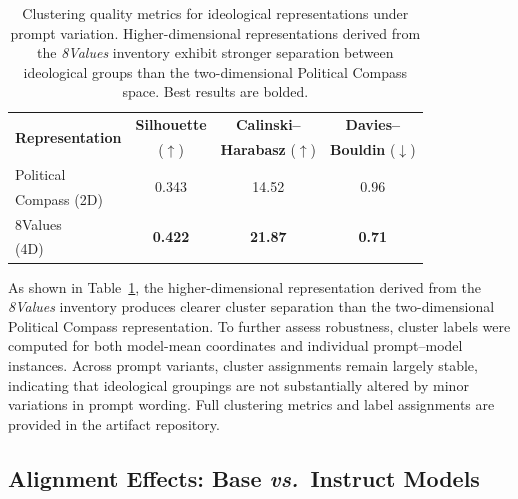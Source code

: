 \documentclass[11pt]{article}
\begin{document}
\begin{table}[t]
\centering
\small
\setlength{\tabcolsep}{4pt} %
\begin{tabular}{@{} l c c c @{}} %
\toprule
\multirow{2}{*}{\textbf{Representation}} & \textbf{Silhouette} & \textbf{Calinski--} & \textbf{Davies--} \\
 & ($\uparrow$) & \textbf{Harabasz} ($\uparrow$) & \textbf{Bouldin} ($\downarrow$) \\
\midrule
Political     & \multirow{2}{*}{0.343}          & \multirow{2}{*}{14.52}          & \multirow{2}{*}{0.96} \\
Compass (2D)  &                                 &                                 &                       \\
\addlinespace %
8Values       & \multirow{2}{*}{\textbf{0.422}} & \multirow{2}{*}{\textbf{21.87}} & \multirow{2}{*}{\textbf{0.71}} \\
(4D)          &                                 &                                 &                                \\
\bottomrule
\end{tabular}
\caption{Clustering quality metrics for ideological representations under prompt variation. Higher-dimensional representations derived from the \textit{8Values} inventory exhibit stronger separation between ideological groups than the two-dimensional Political Compass space. Best results are bolded.}
\label{tab:clustering_prompt}
\end{table}

As shown in Table~\ref{tab:clustering_prompt}, the higher-dimensional
representation derived from the \textit{8Values} inventory produces clearer
cluster separation than the two-dimensional Political Compass representation.
To further assess robustness, cluster labels were computed for both
model-mean coordinates and individual prompt–model instances. Across prompt
variants, cluster assignments remain largely stable, indicating that
ideological groupings are not substantially altered by minor variations in
prompt wording. Full clustering metrics and label assignments are provided in
the artifact repository.



\subsection{Alignment Effects: Base \textit{vs.}\ Instruct Models}
\label{app:phaseib-alignment}
\end{document}
